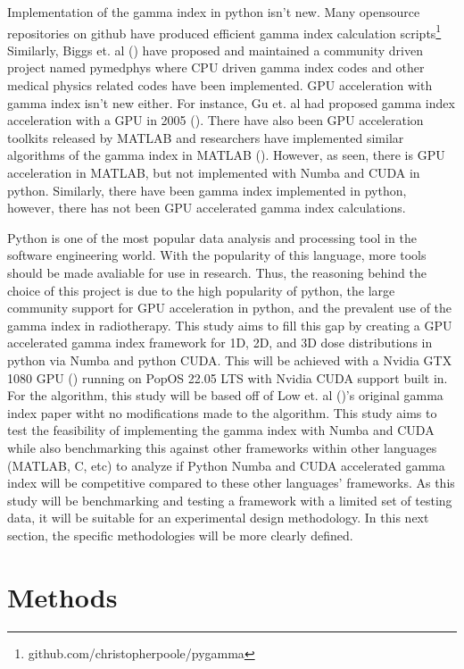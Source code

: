 \documentclass[12pt]{article}
\begin{document}
Implementation of the gamma index in python isn’t new. Many opensource repositories on github have produced efficient gamma index calculation scripts\footnote[1]{github.com/christopherpoole/pygamma} Similarly, Biggs et. al (\textcite{Biggs}) have proposed and maintained a community driven project named pymedphys where CPU driven gamma index codes and other medical physics related codes have been implemented. GPU acceleration with gamma index isn’t new either. For instance, Gu et. al had proposed gamma index acceleration with a GPU in 2005 (\textcite{Gu}). There have also been GPU acceleration toolkits released by MATLAB and researchers have implemented similar algorithms of the gamma index in MATLAB (\textcite{Matlab}). However, as seen, there is GPU acceleration in MATLAB, but not implemented with Numba and CUDA in python. Similarly, there have been gamma index implemented in python, however, there has not been GPU accelerated gamma index calculations.

Python is one of the most popular data analysis and processing tool in the software engineering world. With the popularity of this language, more tools should be made avaliable for use in research. Thus, the reasoning behind the choice of this project is due to the high popularity of python, the large community support for GPU acceleration in python, and the prevalent use of the gamma index in radiotherapy. This study aims to fill this gap by creating a GPU accelerated gamma index framework for 1D, 2D, and 3D dose distributions in python via Numba and python CUDA. This will be achieved with a Nvidia GTX 1080 GPU (\textcite{NVidia}) running on PopOS 22.05 LTS with Nvidia CUDA support built in. For the algorithm, this study will be based off of Low et. al (\textcite{Low})’s original gamma index paper witht no modifications made to the algorithm. This study aims to test the feasibility of implementing the gamma index with Numba and CUDA while also benchmarking this against other frameworks within other languages (MATLAB, C, etc) to analyze if Python Numba and CUDA accelerated gamma index will be competitive compared to these other languages’ frameworks. As this study will be benchmarking and testing a framework with a limited set of testing data, it will be suitable for an experimental design methodology. In this next section, the specific methodologies will be more clearly defined.

\section{Methods}
\end{document}
